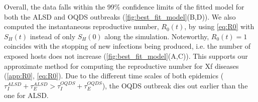 \begin{table}[H]
    \centering
    \caption{Estimated epidemiological parameters from Bayesian model
        fitting to the disease progression curve of OQDS in Apulia.}
    \label{tab:parameter_estimates_OQDS}
\end{table}

Overall, the data falls within the 99\% confidence limits of the fitted
model for both the ALSD and OQDS outbreaks (\cref{fig:best_fit_model}(B,D)). We
also computed the instantaneous reproductive number, $R_0(t)$, by using
\cref{eq:R0} with $S_H(t)$ instead of only $S_H(0)$ along the simulation.
Noteworthy, $R_0(t)=1$ coincides with the stopping of new infections being
produced, i.e. the number of exposed hosts does not increase
(\cref{fig:best_fit_model}(A,C)). This supports our approximate method for
computing the reproductive number for Xf diseases (\cref{app:R0},
\cref{eq:R0}). Due to the different time scales of both epidemics
($\tau_I^{ALSD}+\tau_E^{ALSD} > \tau_I^{OQDS}+\tau_E^{OQDS}$), the OQDS
outbreak dies out earlier than the one for ALSD.


